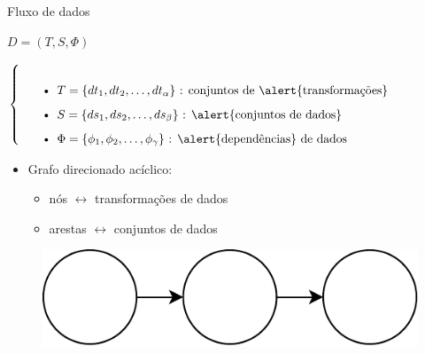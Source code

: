\documentclass[12pt,compress,final]{beamer}
\begin{document}
\begin{frame}[t]{Fluxo de dados}

\centerline{$D = (T, S, \Phi)$}

$\left\{
\begin{tabular}{p{\textwidth}}
\begin{itemize}
    \item \( T = \{dt_1, dt_2, \ldots, dt_{\alpha}\} \) : conjuntos de \alert{transformações}
    \item \( S = \{ds_1, ds_2, \ldots, ds_{\beta}\} \) : \alert{conjuntos de dados}
    \item \( \Phi = \{\phi_1, \phi_2, \ldots, \phi_{\gamma}\} \) : \alert{dependências} de dados
\end{itemize}
\end{tabular}
\right.$

\vfill

\begin{itemize}
\item \alert{Grafo} direcionado acíclico:
\begin{itemize}
\item nós $\leftrightarrow$ transformações de dados
\item arestas $\leftrightarrow$ conjuntos de dados
\end{itemize}
\end{itemize}

\begin{figure}
\includegraphics[width=.35\textwidth]{img/graph.pdf}
\end{figure}

\end{frame}


% 
% 
% 
% 
\end{document}
